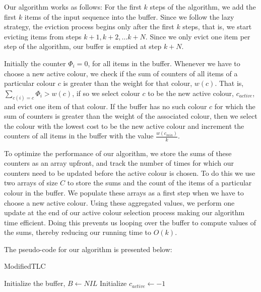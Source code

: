 Our algorithm works as follows: For the first $k$ steps of the algorithm, we add the first $k$ items of the input sequence into the buffer. Since we follow the lazy strategy, the eviction process begins only after the first $k$ steps, that is, we start evicting items from steps $k + 1, k + 2, \ldots k + N$. Since we only evict one item per step of the algorithm, our buffer is emptied at step $k + N$. 

Initially the counter $\Phi_i = 0$, for all items in the buffer. Whenever we have to choose a new active colour, we check if the sum of counters of all items of a particular colour $c$ is greater than the weight for that colour, $w(c)$. That is, $\sum_{c(i) = c} \Phi_i > w(c)$, if so we select colour $c$ to be the new active colour, $c_{active}$, and evict one item of that colour. If the buffer has no such colour $c$ for which the sum of counters is greater than the weight of the associated colour, then we select the colour with the lowest cost to be the new active colour and increment the counters of all items in the buffer with the value $\frac{w(c_{min})}{k}$. 

To optimize the performance of our algorithm, we store the sums of these counters as an array upfront, and track the number of times for which our counters need to be updated before the active colour is chosen. To do this we use two arrays of size $C$ to store the sums and the count of the items of a particular colour in the buffer. We populate these arrays as a first step when we have to choose a new active colour. Using these aggregated values, we perform one update at the end of our active colour selection process making our algorithm time efficient. Doing this prevents us looping over the buffer to compute values of the sums, thereby reducing our running time to $O(k)$. 

The pseudo-code for our algorithm is presented below:

\begin{algorithm}
\caption{ModifiedTLC}
\label{modifiedtlcpseudocode}
Initialize the buffer, $B \gets NIL$ \;
Initialize $c_{active} \gets -1$ \;
\end{algorithm}

